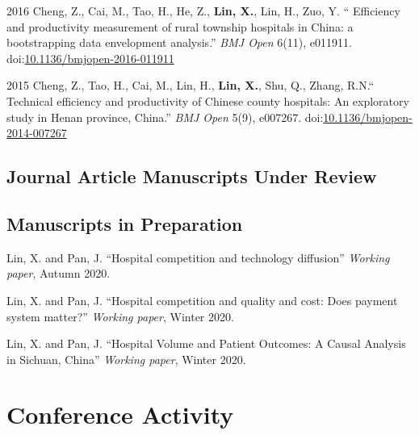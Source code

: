 \documentclass[12pt,letterpaper]{report}
\begin{document}
\begin{tablist}
		\item[2016] \tab Cheng, Z., Cai, M., Tao, H., He, Z., \textbf{Lin, X.}, Lin, H., Zuo, Y. \enquote{ Efficiency and productivity measurement of rural township hospitals in China: a bootstrapping data envelopment analysis.} \textit{BMJ Open}  6(11), e011911. doi:\href{https://doi.org/10.1136/bmjopen-2016-011911}{10.1136/bmjopen-2016-011911}
		
		\item[2015] \tab Cheng, Z., Tao, H., Cai, M., Lin, H., \textbf{Lin, X.}, Shu, Q., Zhang, R.N.\enquote{ Technical efficiency and productivity of Chinese county hospitals: An exploratory study in Henan province, China.} \textit{BMJ Open}  5(9), e007267. doi:\href{https://doi.org/10.1136/bmjopen-2014-007267}{10.1136/bmjopen-2014-007267}

 	\end{tablist}

    \subsection*{Journal Article Manuscripts Under Review}



    \subsection*{Manuscripts in Preparation}

    \begin{tablist}
        
		\item[\the\year] \tab Lin, X. and Pan, J. \enquote{Hospital competition and technology diffusion} \textit{Working paper}, Autumn 2020.
		
		\item[\the\year] \tab Lin, X. and Pan, J. \enquote{Hospital competition and quality and cost: Does payment system matter?}  \textit{Working paper}, Winter 2020.
		
		\item[\the\year] \tab Lin, X. and Pan, J. \enquote{Hospital Volume and Patient Outcomes: A Causal Analysis in Sichuan, China}  \textit{Working paper}, Winter 2020.
		
     \end{tablist}

    \section*{Conference Activity}
\end{document}
